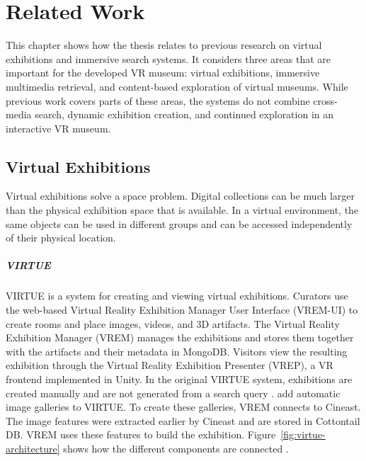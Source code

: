 \chapter{Related Work}
\label{ch:related-work}

\begingroup
\setaftersecskip{6pt}
\setlength{\emergencystretch}{2em}
This chapter shows how the thesis relates to previous research on virtual exhibitions and immersive search systems. It considers three areas that are important for the developed VR museum: virtual exhibitions, immersive multimedia retrieval, and content-based exploration of virtual museums. While previous work covers parts of these areas, the systems do not combine cross-media search, dynamic exhibition creation, and continued exploration in an interactive VR museum.

\section{Virtual Exhibitions}
\label{sec:related-virtual-exhibitions}

Virtual exhibitions solve a space problem. Digital collections can be much larger than the physical exhibition space that is available. In a virtual environment, the same objects can be used in different groups and can be accessed independently of their physical location.

\paragraph{VIRTUE}
VIRTUE is a system for creating and viewing virtual exhibitions. Curators use the web-based Virtual Reality Exhibition Manager User Interface (VREM-UI) to create rooms and place images, videos, and 3D artifacts. The Virtual Reality Exhibition Manager (VREM) manages the exhibitions and stores them together with the artifacts and their metadata in MongoDB. Visitors view the resulting exhibition through the Virtual Reality Exhibition Presenter (VREP), a VR frontend implemented in Unity. In the original VIRTUE system, exhibitions are created manually and are not generated from a search query \citep{giangreco2019virtue,peterhans2022galleries}.
\citet{peterhans2022galleries} add automatic image galleries to VIRTUE. To create these galleries, VREM connects to Cineast. The image features were extracted earlier by Cineast and are stored in Cottontail DB. VREM uses these features to build the exhibition. Figure~\ref{fig:virtue-architecture} shows how the different components are connected \citep{peterhans2022galleries}.

